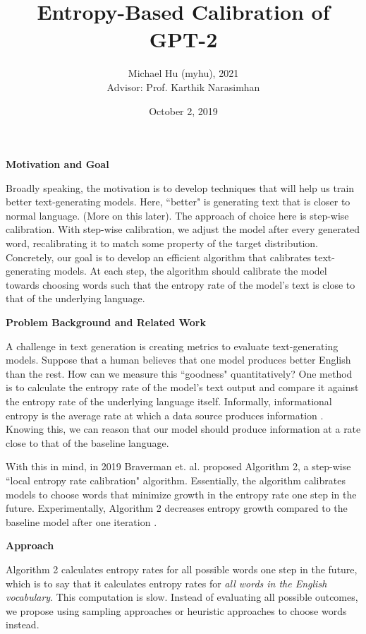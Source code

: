 \documentclass[12pt]{extarticle}
\title{Entropy-Based Calibration of GPT-2}
\author{Michael Hu (myhu), 2021 \\ 
Advisor: Prof. Karthik Narasimhan}
\date{October 2, 2019}
\begin{document}
\maketitle

{\large \textbf{Motivation and Goal}}

Broadly speaking, the motivation is to develop techniques that will help us train better text-generating models. Here, ``better" is generating text that is closer to normal language. (More on this later). The approach of choice here is step-wise calibration. With step-wise calibration, we adjust the model after every generated word, recalibrating it to match some property of the target distribution. Concretely, our goal is to develop an efficient algorithm that calibrates text-generating models. At each step, the algorithm should calibrate the model towards choosing words such that the entropy rate of the model's text is close to that of the underlying language.

{\large \textbf{Problem Background and Related Work}}

A challenge in text generation is creating metrics to evaluate text-generating models. Suppose that a human believes that one model produces better English than the rest. How can we measure this ``goodness" quantitatively? One method is to calculate the entropy rate of the model's text output and compare it against the entropy rate of the underlying language itself. Informally, informational entropy is the average rate at which a data source produces information \cite{shannon-ie}. Knowing this, we can reason that our model should produce information at a rate close to that of the baseline language.

With this in mind, in 2019 Braverman et. al. proposed Algorithm 2, a step-wise ``local entropy rate calibration" algorithm. Essentially, the algorithm calibrates models to choose words that minimize growth in the entropy rate one step in the future. Experimentally, Algorithm 2 decreases entropy growth compared to the baseline model after one iteration \cite{Braverman}. 

{\large \textbf{Approach}}

Algorithm 2 calculates entropy rates for all possible words one step in the future, which is to say that it calculates entropy rates for \textit{all words in the English vocabulary}. This computation is slow. Instead of evaluating all possible outcomes, we propose using sampling approaches or heuristic approaches to choose words instead. 
\end{document}
